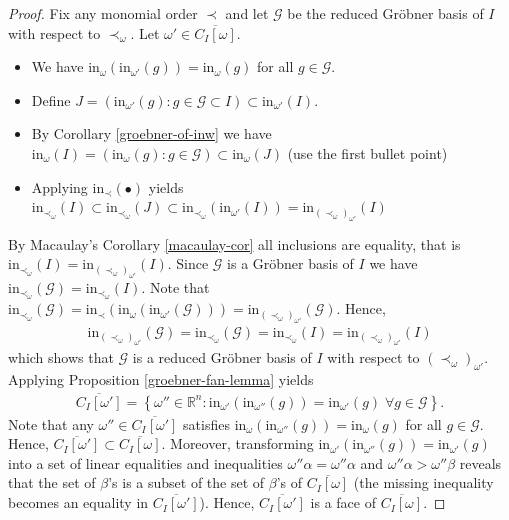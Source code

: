 \documentclass[a4paper, 11pt]{article}
\begin{document}
\begin{proof}
  Fix any monomial order \( \prec \) and let \( \mathcal{G} \) be the reduced Gröbner basis of \( I \) with respect to \( \prec_\omega \). Let \( \omega' \in \overline{C_I[\omega]} \). 

  \begin{itemize}
    \item  We have \(  \mathrm{in}_\omega(\mathrm{in}_{\omega'}(g)) = \mathrm{in}_\omega(g) \) for all \( g \in \mathcal{G} \).
    \item Define \( J = (\mathrm{in}_{\omega'}(g) : g \in \mathcal{G} \subset I) \subset \mathrm{in}_{\omega'}(I) \).
    \item By Corollary \ref{groebner-of-inw} we have \( \mathrm{in}_\omega(I) = (\mathrm{in}_\omega(g) : g \in \mathcal{G}) \subset \mathrm{in}_{\omega}(J) \) (use the first bullet point)
    \item Applying \( \mathrm{in}_{\prec} (\bullet)\) yields \( \mathrm{in}_{\prec_\omega}(I) \subset \mathrm{in}_{\prec_\omega}(J) \subset \mathrm{in}_{\prec_\omega}(\mathrm{in}_{\omega'}(I)) = \mathrm{in}_{(\prec_\omega)_{\omega'}}(I) \)
  \end{itemize}

  By Macaulay's Corollary \ref{macaulay-cor} all inclusions are equality, that is \(  \mathrm{in}_{\prec_\omega}(I ) =  \mathrm{in}_{(\prec_\omega)_{\omega'}}(I)  \).
  Since \( \mathcal{G} \)  is a Gröbner basis of \( I \) we have \( \mathrm{in}_{\prec_\omega}(\mathcal{G}) = \mathrm{in}_{\prec_\omega}(I )  \). Note that \( \mathrm{in}_{\prec_\omega}(\mathcal{G}) = \mathrm{in}_{\prec}(\mathrm{in}_{\omega}(\mathrm{in}_{\omega'}(\mathcal{G}))) = \mathrm{in}_{(\prec_{\omega})_{\omega'}}(\mathcal{G}) \). Hence,
  \begin{align*}
    \mathrm{in}_{(\prec_{\omega})_{\omega'}}(\mathcal{G}) = \mathrm{in}_{\prec_\omega}(\mathcal{G}) = \mathrm{in}_{\prec_\omega}(I ) =  \mathrm{in}_{(\prec_\omega)_{\omega'}}(I) 
  \end{align*}
  which shows that \( \mathcal{G} \) is a reduced Gröbner basis of \( I \) with respect to \( (\prec_\omega)_{\omega'} \). Applying Proposition \ref{groebner-fan-lemma} yields 
  \begin{align*}
    \overline{C_I[\omega']} = \left\{ \omega '' \in \mathbb R^n : \mathrm{in}_{\omega'}(\mathrm{in}_{\omega''}(g)) = \mathrm{in}_{\omega'}(g) \; \forall g \in \mathcal{G} \right\}.
  \end{align*}
  Note that any \( \omega'' \in  \overline{C_I[\omega']} \) satisfies \(  \mathrm{in}_\omega(\mathrm{in}_{\omega''}(g)) = \mathrm{in}_\omega(g) \) for all \( g \in \mathcal{G} \). Hence, \(   \overline{C_I[\omega']} \subset   \overline{C_I[\omega]} \). Moreover, transforming \(  \mathrm{in}_{\omega'}(\mathrm{in}_{\omega''}(g)) = \mathrm{in}_{\omega'}(g)  \) into a set of linear equalities and inequalities \( \omega'' \alpha = \omega '' \alpha \) and \( \omega'' \alpha > \omega'' \beta \) reveals that the set of \( \beta \)'s is a subset of the set of \( \beta \)'s of \( \overline{C_I[\omega]} \) (the missing inequality becomes an equality in \( \overline{C_I[\omega']} \)). Hence, \(  \overline{C_I[\omega']} \) is a face of \(  \overline{C_I[\omega]} \).
\end{proof}
\end{document}

